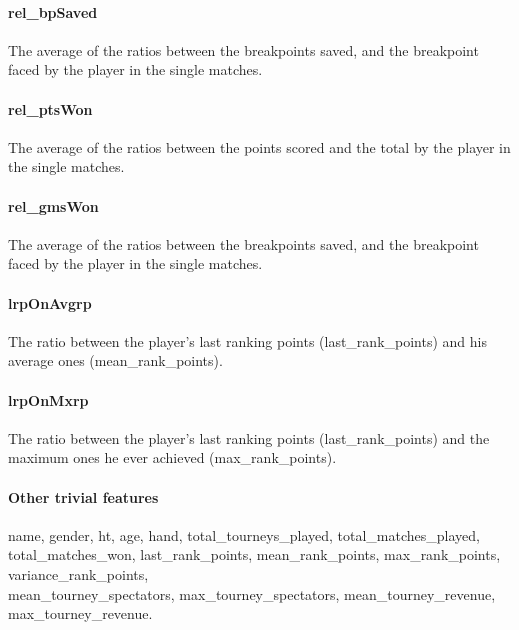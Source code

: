 \documentclass{article}
\begin{document}
\paragraph{rel\_bpSaved}
The average of the ratios between the breakpoints saved, and the breakpoint faced by the player in the single matches.

\paragraph{rel\_ptsWon}
The average of the ratios between the points scored and the total by the player in the single matches.

\paragraph{rel\_gmsWon}
The average of the ratios between the breakpoints saved, and the breakpoint faced by the player in the single matches.

\paragraph{lrpOnAvgrp}
The ratio between the player's last ranking points (last\_rank\_points) and his average ones (mean\_rank\_points).

\paragraph{lrpOnMxrp}
The ratio between the player's last ranking points (last\_rank\_points) and the maximum ones he ever achieved (max\_rank\_points).

\paragraph{Other trivial features}
name, gender, ht, age, hand, total\_tourneys\_played, total\_matches\_played,\\ total\_matches\_won, last\_rank\_points, mean\_rank\_points, max\_rank\_points, variance\_rank\_points, \\ mean\_tourney\_spectators, max\_tourney\_spectators, mean\_tourney\_revenue, max\_tourney\_revenue.    
\newpage
\end{document}
